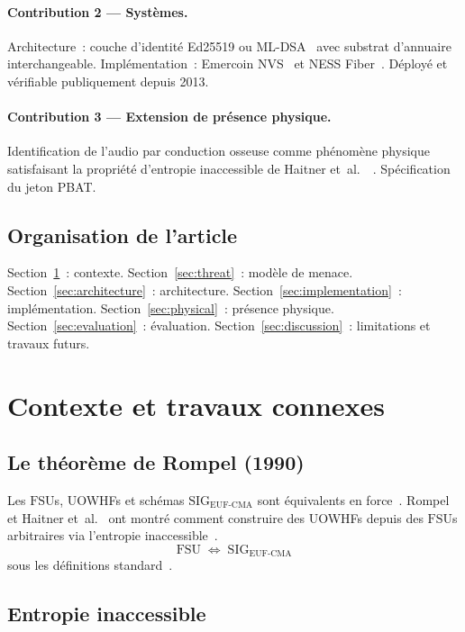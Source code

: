 \documentclass[11pt,a4paper]{article}
\theoremstyle{definition}
\newcommand{\OWF}{\mathrm{FSU}}
\newcommand{\SIG}{\mathrm{SIG}}
\newcommand{\EUFCMA}{\mathrm{EUF\text{-}CMA}}
\newcommand{\PBAT}{\textsf{PBAT}}
\begin{document}
\paragraph{Contribution 2 --- Systèmes.}
Architecture~: couche d'identité Ed25519 ou ML-DSA~\cite{FIPS204}
avec substrat d'annuaire interchangeable. Implémentation~: Emercoin
NVS~\cite{Emercoin} et NESS Fiber~\cite{DPO}. Déployé et vérifiable
publiquement depuis 2013.

\paragraph{Contribution 3 --- Extension de présence physique.}
Identification de l'audio par conduction osseuse comme phénomène
physique satisfaisant la propriété d'entropie inaccessible de Haitner
et~al.~\cite{Haitner10}~\cite{HeadSonic25,HCRAuth24}. Spécification
du jeton \PBAT{}.

\subsection{Organisation de l'article}

Section~\ref{sec:background}~: contexte. Section~\ref{sec:threat}~:
modèle de menace. Section~\ref{sec:architecture}~: architecture.
Section~\ref{sec:implementation}~: implémentation.
Section~\ref{sec:physical}~: présence physique.
Section~\ref{sec:evaluation}~: évaluation.
Section~\ref{sec:discussion}~: limitations et travaux futurs.

\section{Contexte et travaux connexes}
\label{sec:background}

\subsection{Le théorème de Rompel (1990)}

Les $\OWF$s, UOWHFs et schémas $\SIG_{\EUFCMA}$ sont équivalents en
force~\cite{NaorYung89}. Rompel~\cite{Rompel90} et Haitner
et~al.~\cite{Haitner10} ont montré comment construire des UOWHFs
depuis des $\OWF$s arbitraires via l'entropie inaccessible~\cite{KatzKoo05}.
\[
  \OWF \;\Leftrightarrow\; \SIG_{\EUFCMA}
\]
sous les définitions standard~\cite{Rompel90,Goldreich01}.

\subsection{Entropie inaccessible}
\label{sec:inaccessible}
\end{document}
